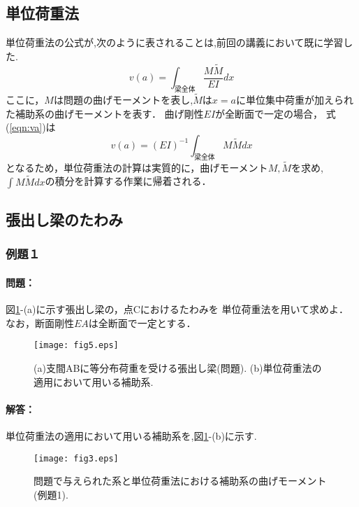 ﻿\documentclass[10pt,a4j]{jarticle}
\begin{document}
\subsection{単位荷重法}
単位荷重法の公式が,次のように表されることは,前回の講義において既に学習した.
\begin{equation}
	v(a)=\int_{梁全体} \frac{M\tilde M}{EI}dx
	\label{eqn:va}
\end{equation}
ここに，$M$は問題の曲げモーメントを表し,$\tilde M$は$x=a$に単位集中荷重が加えられた補助系の曲げモーメントを表す．
曲げ剛性$EI$が全断面で一定の場合，
式(\ref{eqn:va})は
\begin{equation}
	v(a)=(EI)^{-1}\int_{梁全体} M\tilde Mdx
	\label{eqn:va2}
\end{equation}
となるため，単位荷重法の計算は実質的に，曲げモーメント$M,\tilde M$を求め,
$\int M\tilde M dx$の積分を計算する作業に帰着される．
\subsection{張出し梁のたわみ}
\subsubsection{例題１}
\paragraph{問題：}
図\ref{fig:fig2_5}-(a)に示す張出し梁の，点Cにおけるたわみを
単位荷重法を用いて求めよ．なお，断面剛性$EA$は全断面で一定とする．
\begin{figure}[h]
	\begin{center}
	\texttt{[image: fig5.eps]} 
	\end{center}
	\caption{(a)支間ABに等分布荷重を受ける張出し梁(問題).
	 (b)単位荷重法の適用において用いる補助系.} 
	\label{fig:fig2_5}
\end{figure}
\paragraph{解答：}
単位荷重法の適用において用いる補助系を,図\ref{fig:fig2_5}-(b)に示す.
\begin{figure}[h]
	\begin{center}
	\texttt{[image: fig3.eps]} 
	\end{center}
	\caption{問題で与えられた系と単位荷重法における補助系の曲げモーメント(例題1).} 
	\label{fig:fig3}
\end{figure}
\end{document}
